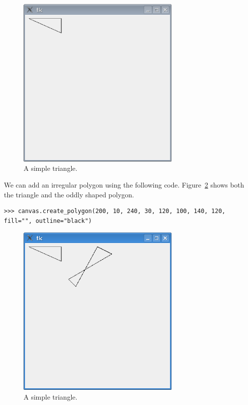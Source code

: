 \begin{figure}
\begin{center}
\includegraphics[width=80mm]{eps/figure41.eps}
\end{center}
\caption{A simple triangle.}\label{fig41}
\end{figure}

We can add an irregular polygon using the following code. Figure~\ref{fig42} shows both the triangle and the oddly shaped polygon.

\begin{listing}
\begin{verbatim}
>>> canvas.create_polygon(200, 10, 240, 30, 120, 100, 140, 120, fill="", outline="black")
\end{verbatim}
\end{listing}

\begin{figure}
\begin{center}
\includegraphics[width=80mm]{eps/figure42.eps}
\end{center}
\caption{A simple triangle.}\label{fig42}
\end{figure}

